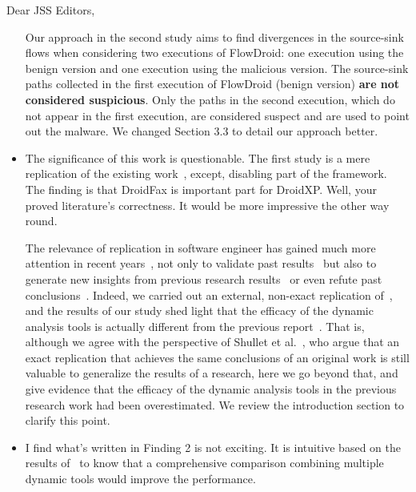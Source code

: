 \documentclass[12pt,english]{scrartcl}
\begin{document}
\begin{letter}{Dear JSS Editors,}
\begin{itemize}
\vspace{0.2cm}

{\color{blue}{\bf Answer.} Our approach in the second study aims to find divergences in the source-sink
  flows when considering two executions of FlowDroid: one execution using the benign version and
  one execution using the malicious version. The source-sink paths collected
  in the first execution of FlowDroid (benign version)
  {\bf are not considered suspicious}. Only the paths in the second execution, which do not appear in the first execution, are considered suspect and are used to point out the malware. We changed Section 3.3 to
  detail our approach better.}

\vspace{0.2cm}

\item The significance of this work is questionable. The first study is a mere replication of the existing
  work~\cite{DBLP:conf/wcre/BaoLL18}, except, disabling 
part of the framework. The finding is that DroidFax is important part for DroidXP. Well, your proved literature's correctness. 
It would be more impressive the other way round.


\vspace{0.2cm}

{\color{blue}{\bf Answer.} The relevance of replication in software engineer
  has gained much more attention in recent years~\cite{role-of-replication,shepperd-role-replication},
  not only to validate past results~\cite{msr-replication} but also to generate new insights
  from previous research results~\cite{kohl:icse-2020} or even refute past conclusions~\cite{toplas-replication}.
  Indeed, we carried out an external, non-exact replication
  of~\cite{DBLP:conf/wcre/BaoLL18}, and the results of our study
  shed light that the efficacy of the dynamic analysis tools is
  actually different from the previous report~\cite{DBLP:conf/wcre/BaoLL18}. That is,
  although we agree with the perspective of
  Shullet et al.~\cite{role-of-replication},
  who argue that an exact replication that achieves the same conclusions of an original work
  is still valuable to generalize the results of a research, here we go beyond that,
  and give evidence that the efficacy of the dynamic analysis tools in the previous research
  work had been overestimated. We review the introduction section to clarify this point.}

\vspace{0.2cm}

\item I find what's written in Finding 2 is not exciting. It is intuitive based on the results
  of~\cite{jamrozikZ16} to know that a comprehensive 
comparison combining multiple dynamic tools would improve the performance.



\end{itemize}
\end{letter}
\end{document}

